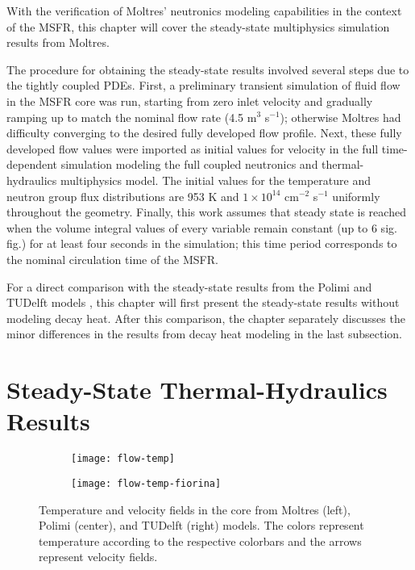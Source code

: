 With the verification of Moltres' neutronics modeling capabilities in the
context of the \gls{MSFR}, this chapter will cover the steady-state
multiphysics simulation results from Moltres.

The procedure for obtaining the steady-state results involved several steps
due to the tightly coupled \glspl{PDE}. First, a preliminary transient
simulation of fluid flow in the \gls{MSFR} core was run, starting from zero
inlet velocity and gradually ramping up to match the nominal flow rate (4.5
m$^3$ s$^{-1}$); otherwise Moltres had difficulty converging to the desired
fully developed flow profile.
Next, these fully developed flow values were imported as initial values for
velocity in the full time-dependent simulation modeling the full coupled
neutronics and thermal-hydraulics multiphysics model. The initial values for
the temperature and neutron group flux distributions are 953 K and
$1 \times 10^{14}$ cm$^{-2}$ s$^{-1}$ uniformly throughout the geometry.
Finally, this work assumes that steady
state is reached when the volume integral values of every variable remain
constant (up to 6 sig. fig.) for at least four seconds in the simulation; this
time period corresponds to the nominal circulation time of the \gls{MSFR}.

For a direct comparison with the steady-state results from the Polimi and
TUDelft models \cite{aufiero_development_2014}, this chapter will first
present the steady-state results without modeling decay heat. After this
comparison, the chapter separately discusses the minor differences in the
results from decay heat modeling in the last subsection.

\section{Steady-State Thermal-Hydraulics Results}

\begin{figure}[t!]
    \centering
    \begin{subfigure}[t]{.365\textwidth}
        \centering
        \texttt{[image: flow-temp]}
    \end{subfigure}
    \hfill
    \begin{subfigure}[t]{.625\textwidth}
        \centering
        \texttt{[image: flow-temp-fiorina]}
    \end{subfigure}
    \caption{Temperature and velocity fields in the core from Moltres
    (left), Polimi (center), and TUDelft (right) models. The colors represent
    temperature according to the respective colorbars and the arrows
    represent velocity fields.}
    \label{fig:flow-temp}
\end{figure}

